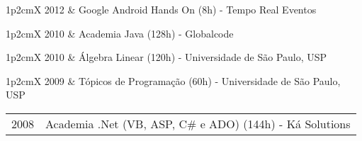 \documentclass[a4paper, oneside, final]{scrartcl}
\newcommand{\vspcitem}{\vspace{0.1cm}} %
\begin{document}
\begin{center}
\begin{tabularx}{1\linewidth}{p{2cm}X}
2012       & Google Android Hands On (8h) - Tempo Real Eventos \vspcitem\\
\end{tabularx}

\begin{tabularx}{1\linewidth}{p{2cm}X}
2010       & Academia Java (128h) - Globalcode \vspcitem\\
\end{tabularx}

\begin{tabularx}{1\linewidth}{p{2cm}X}
2010       & Álgebra Linear (120h) - Universidade de São Paulo, USP \vspcitem\\
\end{tabularx}

\begin{tabularx}{1\linewidth}{p{2cm}X}
2009       & Tópicos de Programação (60h) - Universidade de São Paulo, USP \vspcitem\\
\end{tabularx}

\begin{tabularx}{1\linewidth}{p{2cm}X}
2008       & Academia .Net (VB, ASP, C\# e ADO) (144h) - Ká Solutions 
\end{tabularx}


\end{center}
\end{document}
